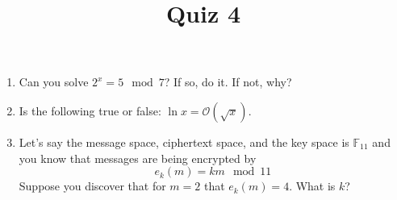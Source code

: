 \documentclass[12pt]{amsart}
\theoremstyle{definition}
\begin{document}
\title{Quiz 4}

\maketitle

\begin{enumerate}
	\item Can you solve $2^x = 5 \mod 7$? If so, do it. If not, why?
	\item Is the following true or false: $\ln x = \mathcal O(\sqrt{x})$.
	\item Let's say the message space, ciphertext space, and the key space is $\mathbb{F}_{11}$ 
		and you know that messages are being encrypted by 
		\begin{displaymath}
			e_k(m) = km \mod 11
		\end{displaymath}
		Suppose you discover that for $m=2$ that $e_k(m) = 4$. What is $k$? 
\end{enumerate}
\end{document}
